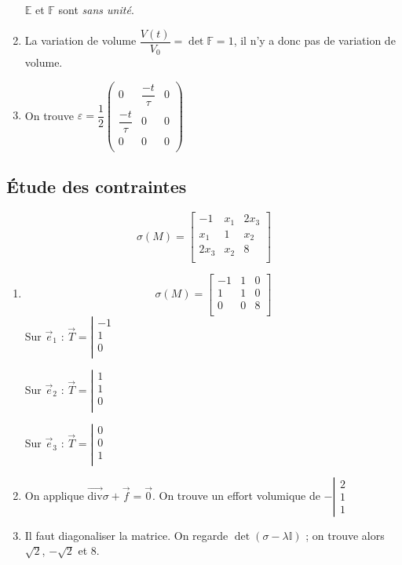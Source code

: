 \documentclass{article}
\begin{document}
\begin{enumerate}
$\mathbb{E}$ et $\mathbb{F}$ sont \emph{sans unité}.

\item La variation de volume $\dfrac{V(t)}{V_0}=\det \mathbb{F} = 1$, il n'y a donc pas de variation de volume.

\item On trouve $\varepsilon = \dfrac{1}{2} \begin{pmatrix}
0 & \dfrac{-t}{\tau} & 0\\
\dfrac{-t}{\tau} & 0 & 0\\
0 & 0 & 0\\
\end{pmatrix}$
\end{enumerate}

\subsection{Étude des contraintes}
\[\sigma(M) = \begin{bmatrix}
-1 & x_1 & 2x_3\\
x_1 & 1 & x_2\\
2x_3 & x_2 & 8\\
\end{bmatrix}
\]
\begin{enumerate}
\item \[\sigma(M) = \begin{bmatrix}
-1 & 1 & 0\\
1 & 1 & 0\\
0 & 0 & 8\\
\end{bmatrix}
\]
Sur $\vec{e}_1$ : $\vec{T} = \left| \begin{matrix}
-1\\
1\\
0\\
\end{matrix} \right.$

Sur $\vec{e}_2$ : $\vec{T} = \left| \begin{matrix}
1\\
1\\
0\\
\end{matrix} \right.$

Sur $\vec{e}_3$ : $\vec{T} = \left| \begin{matrix}
0\\
0\\
1\\
\end{matrix} \right.$

\item On applique $\overrightarrow{\text{div}}\sigma + \vec{f} = \vec{0}$. On trouve un effort volumique de $-\left|\begin{matrix}
2\\1\\1
\end{matrix}\right.$

\item Il faut diagonaliser la matrice. On regarde $\det (\sigma - \lambda \mathbb{I})$ ; on trouve alors $\sqrt{2}$, $-\sqrt{2}$ et 8.
\end{enumerate}
\end{document}
